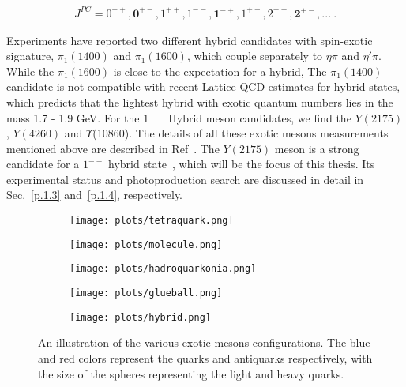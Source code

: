 \begin{equation}
    \label{eq.1.2.2}
    \begin{aligned}
        J^{PC} = 0^{-+}, \bm{0^{+-}}, 1^{++}, 1^{--}, \bm{1^{-+}}, 1^{+-}, 2^{-+}, \bm{2^{+-}},...~.
    \end{aligned}
\end{equation}

Experiments have reported two different hybrid candidates with spin-exotic signature, $\pi_{1}(1400)$ and $\pi_{1}(1600)$, which couple separately to $\eta\pi$ and $\eta \prime \pi$. While the $\pi_{1}(1600)$ is close to the expectation for a hybrid, The $\pi_{1}(1400)$ candidate is not compatible with recent Lattice QCD estimates for hybrid states, which predicts that the lightest hybrid with exotic quantum numbers lies in the mass 1.7 - 1.9 GeV. For the $1^{--}$ Hybrid meson candidates, we find the $Y(2175)$, $Y(4260)$ and $\Upsilon$(10860). The details of all these exotic mesons measurements mentioned above are described in Ref~\cite{Tanabashi18}. The $Y(2175)$ meson is a strong candidate for a $1^{--}$ hybrid state~\cite{Gui07}, which will be the focus of this thesis. Its experimental status and photoproduction search are discussed in detail in Sec.~\ref{p.1.3} and~\ref{p.1.4}, respectively.

\begin{center}
    \null
    \vfill
\begin{figure}[h]
    \centering
    \begin{subfigure}[b]{0.2\textwidth}
        \texttt{[image: plots/tetraquark.png]}
        \caption{}
        \label{fig.1.2.2.a}
    \end{subfigure}\hfill
    \begin{subfigure}[b]{0.2\textwidth}
        \texttt{[image: plots/molecule.png]}
        \caption{}
        \label{fig.1.2.2.b}
    \end{subfigure}\hfill
    \begin{subfigure}[b]{0.2\textwidth}
        \texttt{[image: plots/hadroquarkonia.png]}
        \caption{}
        \label{fig.1.2.2.c}
    \end{subfigure}\hfill
    \begin{subfigure}[b]{0.2\textwidth}
        \texttt{[image: plots/glueball.png]}
        \caption{}
        \label{fig.1.2.2.d}
    \end{subfigure}\hfill
    \begin{subfigure}[b]{0.2\textwidth}
        \texttt{[image: plots/hybrid.png]}
        \caption{}
        \label{fig.1.2.2.e}
    \end{subfigure}    
    \caption{An illustration of the various exotic mesons configurations. The blue and red colors represent the quarks and antiquarks respectively, with the size of the spheres representing the light and heavy quarks.}
    \label{fig.1.2.2}
\end{figure}
\null
\vfill
\end{center}

